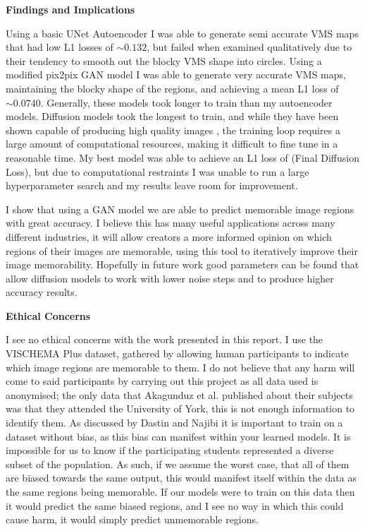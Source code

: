 \documentclass{UoYCSproject}
\begin{document}
\textbf{Findings and Implications}

Using a basic UNet Autoencoder I was able to generate semi accurate VMS maps that had low L1 losses of \(\sim 0.132\), but failed when examined qualitatively due to their tendency to smooth out the blocky VMS shape into circles.
Using a modified pix2pix GAN model \cite{isola2018imagetoimage} I was able to generate very accurate VMS maps, maintaining the blocky shape of the regions, and achieving a mean L1 loss of \(\sim 0.0740\). Generally, these models took longer to train than my autoencoder models.
Diffusion models took the longest to train, and while they have been shown capable of producing high quality images \cite{ramesh2022hierarchical, saharia2022photorealistic}, the training loop requires a large amount of computational resources, making it difficult to fine tune in a reasonable time. My best model was able to achieve an L1 loss of (Final Diffusion Loss), but due to computational restraints I was unable to run a large hyperparameter search and my results leave room for improvement.

I show that using a GAN model we are able to predict memorable image regions with great accuracy. I believe this has many useful applications across many different industries, it will allow creators a more informed opinion on which regions of their images are memorable, using this tool to iteratively improve their image memorability. Hopefully in future work good parameters can be found that allow diffusion models to work with lower noise steps and to produce higher accuracy results.

\textbf{Ethical Concerns}

I see no ethical concerns with the work presented in this report. I use the VISCHEMA Plus dataset, gathered by allowing human participants to indicate which image regions are memorable to them. I do not believe that any harm will come to said participants by carrying out this project as all data used is anonymised; the only data that Akagunduz et al. published about their subjects was that they attended the University of York, this is not enough information to identify them. As discussed by Dastin \cite{dastin_2018} and Najibi \cite{najibi_2020} it is important to train on a dataset without bias, as this bias can manifest within your learned models. It is impossible for us to know if the participating students represented a diverse subset of the population. As such, if we assume the worst case, that all of them are biased towards the same output, this would manifest itself within the data as the same regions being memorable. If our models were to train on this data then it would predict the same biased regions, and I see no way in which this could cause harm, it would simply predict unmemorable regions.
\end{document}

